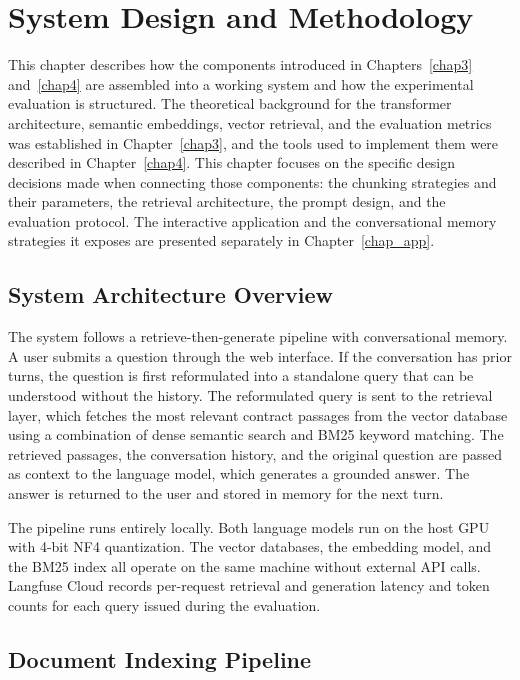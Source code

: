 \chapter{System Design and Methodology}
\label{chap5}

This chapter describes how the components introduced in Chapters~\ref{chap3}
and~\ref{chap4} are assembled into a working system and how the experimental
evaluation is structured. The theoretical background for the transformer
architecture, semantic embeddings, vector retrieval, and the evaluation metrics
was established in Chapter~\ref{chap3}, and the tools used to implement them were
described in Chapter~\ref{chap4}. This chapter focuses on the specific design
decisions made when connecting those components: the chunking strategies and their
parameters, the retrieval architecture, the prompt design, and the evaluation
protocol. The interactive application and the conversational memory strategies it
exposes are presented separately in Chapter~\ref{chap_app}.

\section{System Architecture Overview}

The system follows a retrieve-then-generate pipeline with conversational memory. A
user submits a question through the web interface. If the conversation has prior turns,
the question is first reformulated into a standalone query that can be understood
without the history. The reformulated query is sent to the retrieval layer, which
fetches the most relevant contract passages from the vector database using a
combination of dense semantic search and BM25 keyword matching. The retrieved
passages, the conversation history, and the original question are passed as context to
the language model, which generates a grounded answer. The answer is returned to the
user and stored in memory for the next turn.

The pipeline runs entirely locally. Both language models run on the host GPU with
4-bit NF4 quantization. The vector databases, the embedding model, and the BM25
index all operate on the same machine without external API calls. Langfuse Cloud
records per-request retrieval and generation latency and token counts for each query
issued during the evaluation.

\section{Document Indexing Pipeline}

